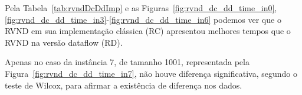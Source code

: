 Pela Tabela~\ref{tab:rvndDcDdImp} e as Figuras~\ref{fig:rvnd_dc_dd_time_in0}, \ref{fig:rvnd_dc_dd_time_in3}-\ref{fig:rvnd_dc_dd_time_in6} podemos ver que o RVND em sua implementação clássica (RC) apresentou melhores tempos que o RVND na versão dataflow (RD).










Apenas no caso da instância 7, de tamanho 1001, representada pela Figura~\ref{fig:rvnd_dc_dd_time_in7}, não houve diferença significativa, segundo o teste de Wilcox, para afirmar a existência de diferença nos dados.

